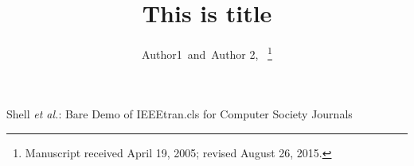 \title{This is title}

\author{Author1~\IEEEmembership{}and~Author 2,~%
\thanks{Manuscript received April 19, 2005; revised August 26, 2015.}}

%
{Shell \MakeLowercase{\textit{et al.}}: Bare Demo of IEEEtran.cls for Computer Society Journals}